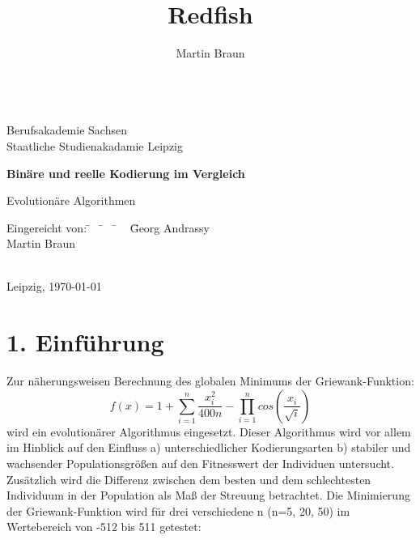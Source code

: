 \documentclass[12pt,
    a4paper,
    headinclude,
    footinclude]{scrreprt}
\author{Martin Braun}
\title{Redfish}
\begin{document}
	\onehalfspacing
	\monthyearsepgerman{\,}{\,}
	\setcounter{tocdepth}{2}
	

	
	\begin{titlepage}
	
		\begin{center}
			~\\[2cm]
			Berufsakademie Sachsen \\
			Staatliche Studienakadamie Leipzig \\[2.4cm]
           
			\begin{huge}
			    \textbf{Binäre und reelle Kodierung im Vergleich} \\[2.4cm]
			\end{huge}
			
			\doublespacing

			Evolutionäre Algorithmen 


		\end{center}
		
		\onehalfspacing
		\begin{tabbing}
			Eingereicht von: \= ~ \= ~ \= ~ \= Georg Andrassy \\
			\> \> \> \> Martin Braun \\
			\\

		\end{tabbing}
		\vspace*{\fill}
		Leipzig, \today
		
	\end{titlepage}
    
    \clearpage
        
    \setcounter{page}{2}
    
\section*{1. Einführung}	\onehalfspacing

Zur näherungsweisen Berechnung des globalen Minimums der Griewank-Funktion: \[f(x) = 1 +  \sum_{i=1}^n \frac{x_i^{2}}{400n} -  \prod \limits_{i=1}^n cos \left(\frac{x_i}{\sqrt{i}}\right)\] wird ein evolutionärer Algorithmus eingesetzt. Dieser Algorithmus wird vor allem im Hinblick auf den Einfluss  a) unterschiedlicher Kodierungsarten b) stabiler und wachsender Populationsgrößen auf den Fitnesswert der Individuen untersucht. Zusätzlich wird die Differenz zwischen dem besten und dem schlechtesten Individuum in der Population als Maß der Streuung betrachtet. Die Minimierung der Griewank-Funktion wird für drei verschiedene n (n=5, 20, 50) im Wertebereich von -512 bis 511 getestet:
\end{document}
